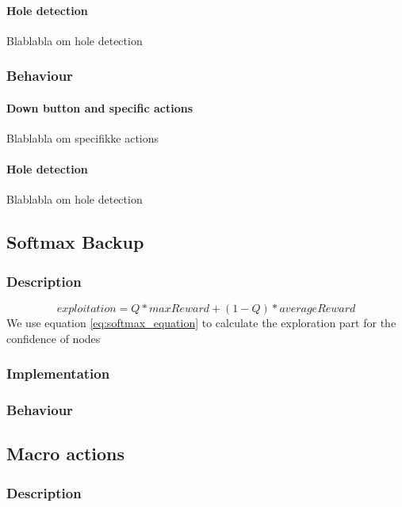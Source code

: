 \documentclass[10pt,a4paper]{article}
\begin{document}
\paragraph{Hole detection}
Blablabla om hole detection

\subsubsection{Behaviour}

\paragraph{Down button and specific actions}
Blablabla om specifikke actions
\paragraph{Hole detection}
Blablabla om hole detection

\subsection{Softmax Backup}
\subsubsection{Description}
\begin{equation}\label{eq:softmax_equation}
exploitation = Q * maxReward + (1 - Q ) * averageReward
\end{equation}
We use equation \ref{eq:softmax_equation} to calculate the exploration part for the confidence of nodes

\subsubsection{Implementation}

\subsubsection{Behaviour}

\subsection{Macro actions}
\label{macro}
\cite{salesman}
\subsubsection{Description}
\end{document}
